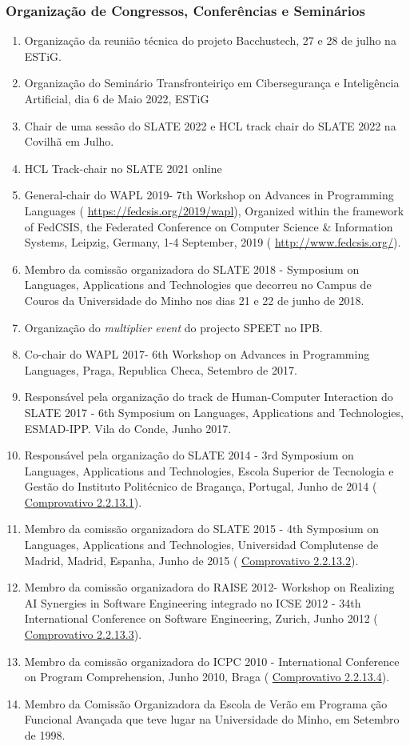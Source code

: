 \documentclass[11pt]{article}
\begin{document}
\subsubsection{Organização de Congressos, Conferências e Seminários}
\begin{enumerate}
\item{Organização da reunião técnica do projeto Bacchustech, 27 e 28 de julho na ESTiG.}
\item{Organização do Seminário Transfronteiriço em Cibersegurança e Inteligência Artificial, dia 6 de Maio 2022, ESTiG}
\item{Chair de uma sessão do SLATE 2022 e HCL track chair do SLATE 2022 na Covilhã em Julho.}
\item{HCL Track-chair no SLATE 2021 online }
\item{General-chair do WAPL 2019- 7th Workshop on Advances in Programming Languages (
\url{https://fedcsis.org/2019/wapl}), Organized within the framework of FedCSIS, the Federated Conference on Computer Science & Information Systems, Leipzig, Germany,  1-4 September, 2019 (
\url{http://www.fedcsis.org/}).}
\item{Membro da comissão organizadora do SLATE 2018 - Symposium on Languages, Applications and Technologies que decorreu no Campus de Couros da Universidade do Minho nos dias 21 e 22 de junho de 2018.}
\item{Organização do {
\em{{multiplier event}}} do projecto SPEET no IPB.}
\item{Co-chair do WAPL 2017- 6th Workshop on Advances in Programming Languages, Praga, Republica Checa, Setembro de 2017.}
\item{Responsável pela organização do track de Human-Computer Interaction do SLATE 2017 - 6th Symposium on Languages, Applications and Technologies, ESMAD-IPP. Vila do Conde, Junho 2017.}
\item{Responsável pela organização do SLATE 2014 - 3rd Symposium on Languages, Applications and Technologies, Escola Superior de Tecnologia e Gestão do Instituto Politécnico de Bragança, Portugal, Junho de 2014 (
\href{run:ComprovativosCOCP/COSLATE2014.pdf}{Comprovativo 2.2.13.1}). }
\item{Membro da comissão organizadora do SLATE 2015 - 4th Symposium on Languages, Applications and Technologies, Universidad Complutense de Madrid, Madrid, Espanha, Junho de 2015 (
\href{run:ComprovativosCOCP/COSLATE2015.pdf}{Comprovativo 2.2.13.2}). }
\item{Membro da comissão organizadora do RAISE 2012- Workshop on Realizing AI Synergies in Software Engineering integrado no ICSE 2012 - 34th International Conference on Software Engineering, Zurich, Junho 2012 (
\href{run:ComprovativosCOCP/COCPRAISE2012.pdf}{Comprovativo 2.2.13.3}).}
\item{Membro da comissão organizadora do ICPC 2010 - International Conference on Program Comprehension, Junho 2010, Braga (
\href{run:ComprovativosCOCP/COICPC10.pdf}{Comprovativo 2.2.13.4}).}
\item{Membro da Comissão Organizadora da Escola de Verão em Programa
\-ção Funcional Avançada que teve lugar na Universidade do Minho, em Setembro de 1998.}
\end{enumerate}
\end{document}
